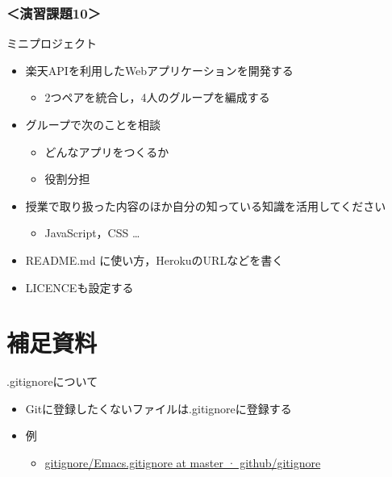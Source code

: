 \documentclass[t, aspectratio=169]{beamer}
\begin{document}
\section{＜演習課題10＞}
\label{sec-10-1}
\begin{frame}[label=sec-10-1-1]{ミニプロジェクト}
\begin{itemize}
\item 楽天APIを利用したWebアプリケーションを開発する
\begin{itemize}
\item 2つペアを統合し，4人のグループを編成する
\end{itemize}
\item グループで次のことを相談
\begin{itemize}
\item どんなアプリをつくるか
\item 役割分担
\end{itemize}
\item 授業で取り扱った内容のほか自分の知っている知識を活用してください
\begin{itemize}
\item JavaScript，CSS \ldots{}
\end{itemize}
\item README.md に使い方，HerokuのURLなどを書く
\item LICENCEも設定する
\end{itemize}
\end{frame}
\part{補足資料}
\label{sec-11}
\begin{frame}[label=sec-11-0-1]{.gitignoreについて}
\begin{itemize}
\item Gitに登録したくないファイルは.gitignoreに登録する
\item 例
\begin{itemize}
\item \href{https://github.com/github/gitignore/blob/master/Global/Emacs.gitignore}{gitignore/Emacs.gitignore at master · github/gitignore}
\end{itemize}
\end{itemize}
\end{frame}
\end{document}
